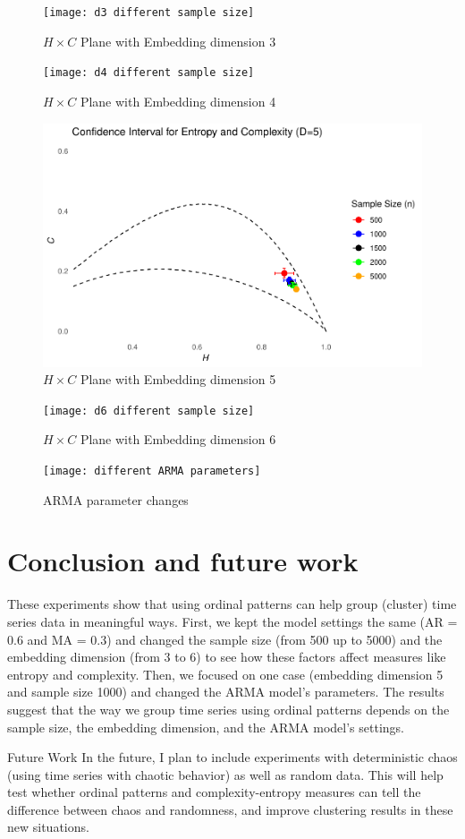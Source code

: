 \documentclass[12pt,a4paper]{article}
\begin{document}
\begin{figure}[H]
	\texttt{[image: d3 different sample size]}
	\caption{$H \times C$ Plane with Embedding dimension 3}
	\label{fig:HC Plane D3}
\end{figure}	

\begin{figure}[H]
	\texttt{[image: d4 different sample size]}
	\caption{$H \times C$ Plane with Embedding dimension 4}
	\label{fig:HC Plane D4}
\end{figure}

\begin{figure}[H]
	\includegraphics[width=0.8 \textwidth]{d5 different sample size}
	\caption{$H \times C$ Plane with Embedding dimension 5}
	\label{fig:HC Plane D5}
\end{figure}

\begin{figure}[H]
	\texttt{[image: d6 different sample size]}
	\caption{$H \times C$ Plane with Embedding dimension 6}
	\label{fig:HC Plane D6}
\end{figure}			
	
\begin{figure}[H]
	\texttt{[image: different ARMA parameters]}
	\caption{ARMA parameter changes}
	\label{fig:HC Plane for different parameters}
\end{figure}	
	
\section{Conclusion and future work}
These experiments show that using ordinal patterns can help group (cluster) time series data in meaningful ways. First, we kept the model settings the same (AR = 0.6 and MA = 0.3) and changed the sample size (from 500 up to 5000) and the embedding dimension (from 3 to 6) to see how these factors affect measures like entropy and complexity. Then, we focused on one case (embedding dimension 5 and sample size 1000) and changed the ARMA model’s parameters. The results suggest that the way we group time series using ordinal patterns depends on the sample size, the embedding dimension, and the ARMA model’s settings.

Future Work
In the future, I plan to include experiments with deterministic chaos (using time series with chaotic behavior) as well as random data. This will help test whether ordinal patterns and complexity-entropy measures can tell the difference between chaos and randomness, and improve clustering results in these new situations.
	
%	
	
\end{document}
